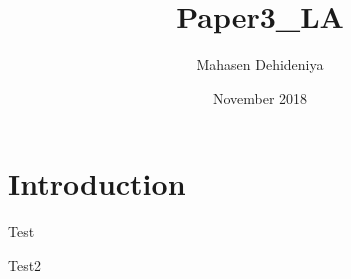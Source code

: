 \documentclass{article}
\title{Paper3_LA}
\author{Mahasen Dehideniya}
\date{November 2018}
\begin{document}
\maketitle

\section{Introduction}
Test

Test2
\end{document}
